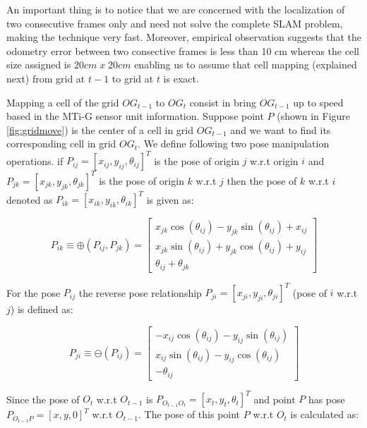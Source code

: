 An important thing is to notice that we are concerned with the localization of two consecutive frames only
and need not solve the complete SLAM problem, making the technique very fast. Moreover, empirical observation suggests that the odometry error between two consective frames is less than 10 cm whereas the cell size assigned is $20cm \; x \; 20cm$ enabling us to assume that cell mapping (explained next) from grid at $t-1$ to grid at $t$ is exact.

Mapping a cell of the grid $OG_{t-1}$ to $OG_t$ consist in bring $OG_{t-1}$ up to speed based in the MTi-G sensor unit information. Suppose point $P$ (shown in Figure \ref{fig:gridmove}) is the center of a cell in grid $OG_{t-1}$ and we want to find its corresponding cell in grid $OG_t$. We define following two pose manipulation operations. if $P_{ij}=[x_{ij}, y_{ij}, \theta_{ij}]^T$ is the pose of origin $j$ w.r.t origin $i$ and $P_{jk}=[x_{jk}, y_{jk}, \theta_{jk}]^T$ is the pose of origin $k$ w.r.t $j$ then the pose of $k$ w.r.t $i$ denoted as $P_{ik}=[x_{ik}, y_{ik}, \theta_{ik}]^T$ is given as:

\begin{equation}
P_{ik} \equiv \oplus (P_{ij}, P_{jk}) = \left[ \begin{array}{c}
x_{jk}\cos(\theta_{ij})-y_{jk}\sin(\theta_{ij})+x_{ij} \\
x_{jk}\sin(\theta_{ij})+y_{jk}\cos(\theta_{ij})+y_{ij} \\
\theta_{ij}+\theta_{jk} \end{array} \right] 
\label{eq:composepose}
\end{equation}

For the pose $P_{ij}$ the reverse pose relationship $P_{ji}=[x_{ji}, y_{ji}, \theta_{ji}]^T$ (pose of $i$ w.r.t $j$) is defined as:

\begin{equation}
P_{ji} \equiv \ominus (P_{ij}) = \left[ \begin{array}{c}
-x_{ij}\cos(\theta_{ij})-y_{ij}\sin(\theta_{ij}) \\
x_{ij}\sin(\theta_{ij})-y_{ij}\cos(\theta_{ij}) \\
-\theta_{ij} \end{array} \right] 
\end{equation}

Since the pose of $O_t$ w.r.t $O_{t-1}$ is $P_{O_{t-1}O_t}=[x_t,y_t,\theta_t]^T$ and point $P$ has pose $P_{O_{t-1}P}=[x,y,0]^T$ w.r.t $O_{t-1}$. The pose of this point $P$ w.r.t $O_t$ is calculated as:

